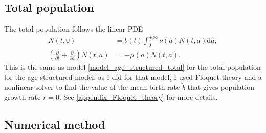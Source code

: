 \documentclass[USenglish]{article}
\newcommand{\md}{\mathrm{d}}
\begin{document}
\subsection{Total population}

The total population follows the linear PDE
\begin{subequations}
  \begin{align}
    N(t, 0) &=
    b(t) \int_0^{+\infty} \nu(a) N(t, a) \md a,
    \\
    \left(\frac{\partial}{\partial t}
      + \frac{\partial}{\partial a}\right)
    N(t, a) &=
    - \mu(a) N(t, a).
  \end{align}
\end{subequations}
This is the same as model \eqref{model_age_structured_total} for the
total population for the age-structured model: as I did for that
model, I used Floquet theory and a nonlinear solver to find the value
of the mean birth rate $\tilde{b}$ that gives population growth rate
$r = 0$.  See \autoref{appendix_Floquet_theory} for more details.


\subsection{Numerical method}
\end{document}
